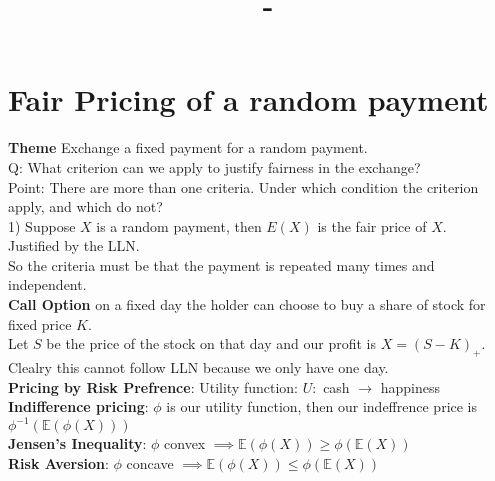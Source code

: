 \documentclass[answers,12pt,addpoints]{exam}
\author{\name}
\title{\course \ - \assignment}
\begin{document}
\maketitle


\newpage

\section{Fair Pricing of a random payment}
\textbf{Theme} Exchange a fixed payment for a random payment.\\
Q: What criterion can we apply to justify fairness in the exchange?\\
Point: There are more than one criteria. Under which condition the criterion apply, and which do not?\\
1) Suppose $X$ is a random payment, then $E(X)$ is the fair price of $X$.\\
Justified by the LLN.\\
So the criteria must be that the payment is repeated many times and independent.\\
\textbf{Call Option}
on a fixed day the holder can choose to buy a share of stock for fixed price $K$.\\
Let $S$ be the price of the stock on that day and our profit is $X = (S-K)_+$.\\
Clealry this cannot follow LLN because we only have one day.\\
\textbf{Pricing by Risk Prefrence}: Utility function: $U:$ cash $\to$ happiness \\
\textbf{Indifference pricing}: $\phi$ is our utility function, then our indeffrence price is $\phi^{-1}(\mathbb{E}(\phi(X)))$\\
\textbf{Jensen's Inequality}: $\phi$ convex $\implies \mathbb{E}(\phi(X)) \geq \phi(\mathbb{E}(X))$\\
\textbf{Risk Aversion}: $\phi$ concave $\implies \mathbb{E}(\phi(X)) \leq \phi(\mathbb{E}(X))$\\
\end{document}
